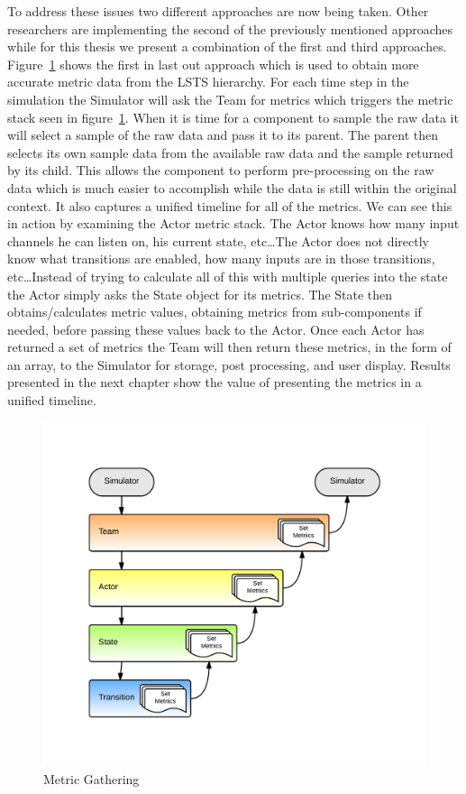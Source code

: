 To address these issues two different approaches are now being taken.  Other researchers are implementing the second of the previously mentioned approaches while for this thesis we present a combination of the first and third approaches.  Figure~\ref{fig:metric_gathering} shows the first in last out approach which is used to obtain more accurate metric data from the LSTS hierarchy.  For each time step in the simulation the Simulator will ask the Team for metrics which triggers the metric stack seen in figure~\ref{fig:metric_gathering}.  When it is time for a component to sample the raw data it will select a sample of the raw data and pass it to its parent.  The parent then selects its own sample data from the available raw data and the sample returned by its child.  This allows the component to perform pre-processing on the raw data which is much easier to accomplish while the data is still within the original context.  It also captures a unified timeline for all of the metrics.  We can see this in action by examining the Actor metric stack.  The Actor knows how many input channels he can listen on, his current state, etc\ldots  The Actor does not directly know what transitions are enabled, how many inputs are in those transitions, etc\ldots  Instead of trying to calculate all of this with multiple queries into the state the Actor simply asks the State object for its metrics.  The State then obtains/calculates metric values, obtaining metrics from sub-components if needed, before passing these values back to the Actor.  Once each Actor has returned a set of metrics the Team will then return these metrics, in the form of an array, to the Simulator for storage, post processing, and user display.  Results presented in the next chapter show the value of presenting the metrics in a unified timeline.

\begin{figure}[h]
\begin{center}
\includegraphics[width=6in]{metric_gathering.png}
\caption{Metric Gathering}
\label{fig:metric_gathering}
\end{center}
\end{figure}

